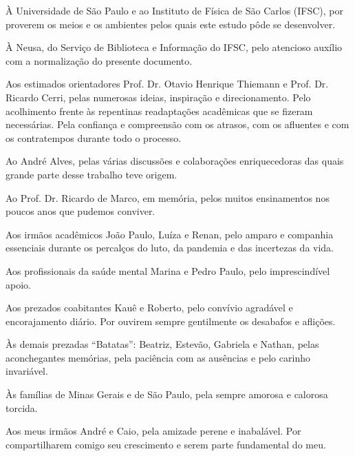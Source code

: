 \begin{agradecimentos}
À Universidade de São Paulo e ao Instituto de Física de São Carlos (IFSC), por proverem os meios e os ambientes pelos quais este estudo pôde se desenvolver.

À Neusa, do Serviço de Biblioteca e Informação do IFSC, pelo atencioso auxílio com a normalização do presente documento.

Aos estimados orientadores Prof. Dr. Otavio Henrique Thiemann e Prof. Dr. Ricardo Cerri, pelas numerosas ideias, inspiração e direcionamento. Pelo acolhimento frente às repentinas readaptações acadêmicas que se fizeram necessárias.
Pela confiança e compreensão com os atrasos, com os afluentes e com os contratempos durante todo o processo.

Ao André Alves, pelas várias discussões e colaboraç\~oes enriquecedoras das quais grande parte desse trabalho teve origem.

Ao Prof. Dr. Ricardo de Marco, em memória, pelos muitos ensinamentos nos poucos anos que pudemos conviver.

Aos irmãos acadêmicos João Paulo, Luíza e Renan, pelo amparo e companhia essenciais durante os percalços do luto, da pandemia e das incertezas da vida.

Aos profissionais da saúde mental Marina e Pedro Paulo, pelo imprescindível apoio.

Aos prezados coabitantes Kauê e Roberto, pelo convívio agradável e encorajamento diário.
Por ouvirem sempre gentilmente os desabafos e aflições.

Às demais prezadas ``Batatas'': Beatriz, Estevão, Gabriela e Nathan, pelas aconchegantes memórias, pela paciência com as ausências e pelo carinho invariável.

Às famílias de Minas Gerais e de São Paulo, pela sempre amorosa e calorosa torcida.

Aos meus irmãos André e Caio, pela amizade perene e inabalável. Por compartilharem comigo seu crescimento e serem parte fundamental do meu.

%

%
%
%


\end{agradecimentos}
